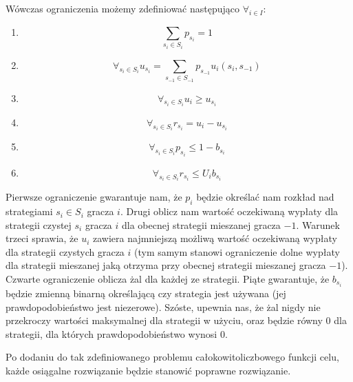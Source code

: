 \documentclass[polish]{standalone}
\begin{document}
Wówczas ograniczenia możemy zdefiniować następująco $\forall_{i \in I}$:
\begin{enumerate}
\item $$\sum_{{s_i} \in S_i} p_{s_i} = 1$$
\item $$\forall_{s_i \in S_i} u_{s_i} = \sum_{s_{-1} \in S_{-1}} p_{s_{-1}} u_i(s_i, s_{-1})$$
\item $$\forall_{s_i \in S_i} u_i \geq u_{s_i}$$
\item $$\forall_{s_i \in S_i} r_{s_i} = u_i - u_{s_i}$$
\item $$\forall_{s_i \in S_i} p_{s_i} \leq 1-b_{s_i}$$
\item $$\forall_{s_i \in S_i} r_{s_i} \leq U_i b_{s_i}$$
\end{enumerate}

Pierwsze ograniczenie gwarantuje nam, że $p_i$ będzie określać nam rozkład nad strategiami $s_i \in S_i$ gracza $i$.
Drugi oblicz nam wartość oczekiwaną wypłaty dla strategii czystej $s_i$ gracza $i$ dla obecnej strategii mieszanej
gracza $-1$. Warunek trzeci sprawia, że $u_i$ zawiera najmniejszą możliwą wartość oczekiwaną wypłaty dla strategii
czystych gracza $i$ (tym samym stanowi ograniczenie dolne wypłaty dla strategii mieszanej jaką otrzyma przy obecnej
strategii mieszanej gracza $-1$). Czwarte ograniczenie oblicza żal dla każdej ze strategii. Piąte gwarantuje, że
$b_{s_i}$ będzie zmienną binarną określającą czy strategia jest używana (jej prawdopodobieństwo jest niezerowe). Szóste,
upewnia nas, że żal nigdy nie przekroczy wartości maksymalnej dla strategii w użyciu, oraz będzie równy 0 dla strategii,
dla których prawdopodobieństwo wynosi 0.

Po dodaniu do tak zdefiniowanego problemu całokowitoliczbowego funkcji celu, każde osiągalne rozwiązanie będzie stanowić
poprawne rozwiązanie. \cite[str.~2]{SCG-NE}
\end{document}

